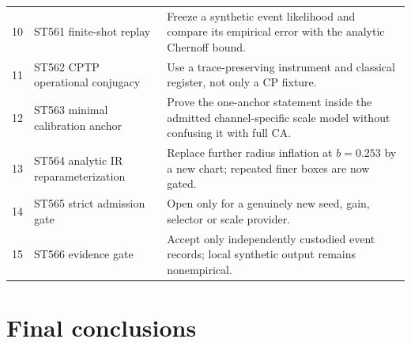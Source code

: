 \documentclass[11pt,a4paper]{article}
\theoremstyle{definition}\newtheorem{definition}[theorem]{Definition}
\theoremstyle{remark}\newtheorem{remark}[theorem]{Remark}
\begin{document}
\begin{longtable}{@{}p{}p{}p{}@{}}
10&ST561 finite-shot replay&Freeze a synthetic event likelihood and compare its empirical error with the analytic Chernoff bound.\\
11&ST562 CPTP operational conjugacy&Use a trace-preserving instrument and classical register, not only a CP fixture.\\
12&ST563 minimal calibration anchor&Prove the one-anchor statement inside the admitted channel-specific scale model without confusing it with full CA.\\
13&ST564 analytic IR reparameterization&Replace further radius inflation at $b=0.253$ by a new chart; repeated finer boxes are now gated.\\
14&ST565 strict admission gate&Open only for a genuinely new seed, gain, selector or scale provider.\\
15&ST566 evidence gate&Accept only independently custodied event records; local synthetic output remains nonempirical.\\\bottomrule\end{longtable}

\section{Final conclusions}
\end{document}
